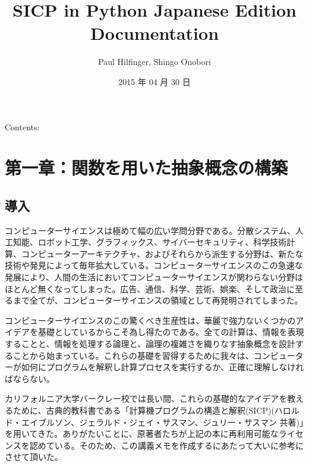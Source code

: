 \documentclass[letterpaper,10pt,dvipdfmx]{sphinxmanual}
\title{SICP in Python Japanese Edition Documentation}
\date{2015 年 04 月 30 日}
\author{Paul Hilfinger, Shingo Onobori}
\begin{document}
\maketitle
\tableofcontents
{}\label{index::doc}


Contents:


\chapter{第一章：関数を用いた抽象概念の構築}
\label{functions::doc}\label{functions:welcome-to-sicp-in-python-japanese-edition-s-documentation}\label{functions:id1}

\section{導入}
\label{functions:id2}
コンピューターサイエンスは極めて幅の広い学問分野である。分散システム、人工知能、ロボット工学、グラフィックス、サイバーセキュリティ、科学技術計算、コンピューターアーキテクチャ、およびそれらから派生する分野は、新たな技術や発見によって毎年拡大している。コンピューターサイエンスのこの急速な発展により、人間の生活においてコンピューターサイエンスが関わらない分野はほとんど無くなってしまった。広告、通信、科学、芸術、娯楽、そして政治に至るまで全てが、コンピューターサイエンスの領域として再発明されてしまった。

コンピューターサイエンスのこの驚くべき生産性は、華麗で強力ないくつかのアイデアを基礎としているからこそ為し得たのである。全ての計算は、情報を表現することと、情報を処理する論理と、論理の複雑さを織りなす抽象概念を設計することから始まっている。これらの基礎を習得するために我々は、コンピューターが如何にプログラムを解釈し計算プロセスを実行するか、正確に理解しなければならない。

カリフォルニア大学バークレー校では長い間、これらの基礎的なアイデアを教えるために、古典的教科書である「計算機プログラムの構造と解釈(SICP)(ハロルド・エイブルソン、ジェラルド・ジェイ・サスマン、ジュリー・サスマン 共著)」を用いてきた。ありがたいことに、原著者たちが上記の本に再利用可能なライセンスを認めている。そのため、この講義メモを作成するにあたって大いに参考にさせて頂いた。
\end{document}
